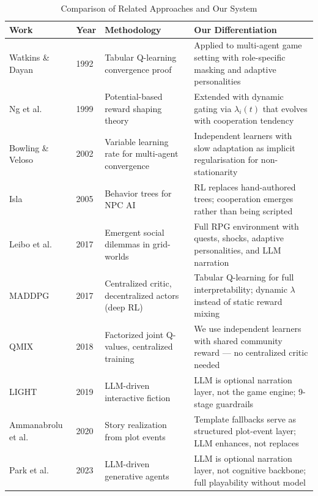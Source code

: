 \documentclass[12pt, a4paper, oneside]{report}
\begin{document}
\begin{table}[H]
\centering
\caption{Comparison of Related Approaches and Our System}
\label{tab:lit-comparison}
\small
\begin{tabularx}{\textwidth}{|l|l|X|X|}
\hline
\textbf{Work} & \textbf{Year} & \textbf{Methodology} & \textbf{Our Differentiation} \\
\hline
Watkins \& Dayan~\cite{watkins1992qlearning} & 1992 & Tabular Q-learning convergence proof & Applied to multi-agent game setting with role-specific masking and adaptive personalities \\
\hline
Ng et al.~\cite{ng1999rewardshaping} & 1999 & Potential-based reward shaping theory & Extended with dynamic gating via $\lambda_i(t)$ that evolves with cooperation tendency \\
\hline
Bowling \& Veloso~\cite{bowling2002multiagent} & 2002 & Variable learning rate for multi-agent convergence & Independent learners with slow adaptation as implicit regularisation for non-stationarity \\
\hline
Isla~\cite{isla2005bt} & 2005 & Behavior trees for NPC AI & RL replaces hand-authored trees; cooperation emerges rather than being scripted \\
\hline
Leibo et al.~\cite{leibo2017multi} & 2017 & Emergent social dilemmas in grid-worlds & Full RPG environment with quests, shocks, adaptive personalities, and LLM narration \\
\hline
MADDPG~\cite{lowe2017maddpg} & 2017 & Centralized critic, decentralized actors (deep RL) & Tabular Q-learning for full interpretability; dynamic $\lambda$ instead of static reward mixing \\
\hline
QMIX~\cite{rashid2018qmix} & 2018 & Factorized joint Q-values, centralized training & We use independent learners with shared community reward --- no centralized critic needed \\
\hline
LIGHT~\cite{urbanek2019light} & 2019 & LLM-driven interactive fiction & LLM is optional narration layer, not the game engine; 9-stage guardrails \\
\hline
Ammanabrolu et al.~\cite{ammanabrolu2020story} & 2020 & Story realization from plot events & Template fallbacks serve as structured plot-event layer; LLM enhances, not replaces \\
\hline
Park et al.~\cite{park2023generative} & 2023 & LLM-driven generative agents & LLM is optional narration layer, not cognitive backbone; full playability without model \\
\hline
\end{tabularx}
\end{table}
\end{document}
